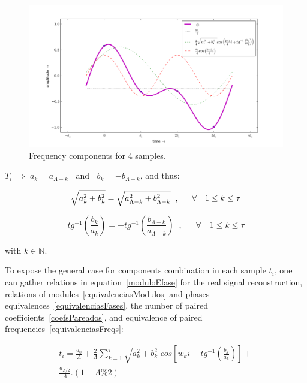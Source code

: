 \documentclass[
 aip,
 jmp,
 amsmath,amssymb,
 reprint,
]{revtex4-1}
\begin{document}
\begin{figure}
    \centering
        \includegraphics[width=\textwidth]{figures/amostras4___}
    \caption{Frequency components for 4 samples.}
        \label{fig:amostras4}
\end{figure}

$T_i \; \Rightarrow \; a_k = a_{\Lambda -k}\;\;$ and $\;\;b_k = - b_{\Lambda -k}$, and thus:

\begin{equation}\label{equivalenciasModulos}
\sqrt{a_k^2 + b_k^2} = \sqrt{a_{\Lambda - k}^2 + b_{\Lambda -k}^2} \;\;, \quad \;\; \forall \quad 1 \leq k \leq \tau  \\
\end{equation}

\begin{equation}\label{equivalenciasFases}
tg^{-1}\left(\frac{b_k}{a_k}\right)=-tg^{-1}\left(\frac{b_{\Lambda -k}}{a_{\Lambda - k}}\right)\;\;,\quad \;\; \forall \quad 1 \leq k \leq \tau
\end{equation}

with $k \in \mathbb{N}$.

To expose the general case for components combination in each sample $t_i$, one can gather relations in equation~\ref{moduloEfase} for the real signal reconstruction, relations of modules~\ref{equivalenciasModulos} and phases equivalences~\ref{equivalenciasFases}, the number of paired coefficients~\ref{coefsPareados}, and equivalence of paired frequencies~\ref{equivalenciasFreqs}:

\begin{multline}\label{eq:reconsCompleta}
t_i = \frac{a_0}{\Lambda} + \frac{2}{\Lambda}\sum_{k=1}^{\tau}\sqrt{a_k^2 + b_k^2} \; cos\left[w_k i - tg^{-1}\left(\frac{b_k}{a_k}\right)\right]+ \\ \frac{ a_{\Lambda/2}}{\Lambda}.(1-\Lambda\% 2)
\end{multline}
\end{document}
